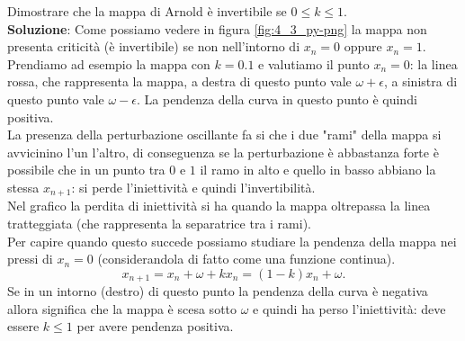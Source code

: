 \begin{ex}
       Dimostrare che la mappa di Arnold è invertibile se $0\le k\le 1$.\\
       \textbf{Soluzione}:
       Come possiamo vedere in figura \ref{fig:4_3_py-png} la mappa non presenta criticità (è invertibile) se non nell'intorno di $x_n=0$ oppure $x_n=1$. \\
       Prendiamo ad esempio la mappa con $k=0.1$ e valutiamo il punto $x_n=0$: la linea rossa, che rappresenta la mappa, a destra di questo punto vale $\omega+\epsilon$, a sinistra di questo punto vale $\omega-\epsilon$. La pendenza della curva in questo punto è quindi positiva.\\
       La presenza della perturbazione oscillante fa si che i due "rami" della mappa si avvicinino l'un l'altro, di conseguenza se la perturbazione è abbastanza forte è possibile che in un punto tra $0$ e $1$ il ramo in alto e quello in basso abbiano la stessa $x_{n+1}$: si perde l'iniettività e quindi l'invertibilità.\\
       Nel grafico la perdita di iniettività si ha quando la mappa oltrepassa la linea tratteggiata (che rappresenta la separatrice tra i rami).\\
       Per capire quando questo succede possiamo studiare la pendenza della mappa nei pressi di $x_n = 0$ (considerandola di fatto come una funzione continua).
       \[
	   x_{n+1} = x_n + \omega + k x_n = (1-k) x_n + \omega
       .\] 
       Se in un intorno (destro) di questo punto la pendenza della curva è negativa allora significa che la mappa è scesa sotto $\omega$ e quindi ha perso l'iniettività: deve essere $k\le 1$ per avere pendenza positiva.
\end{ex}
\noindent

